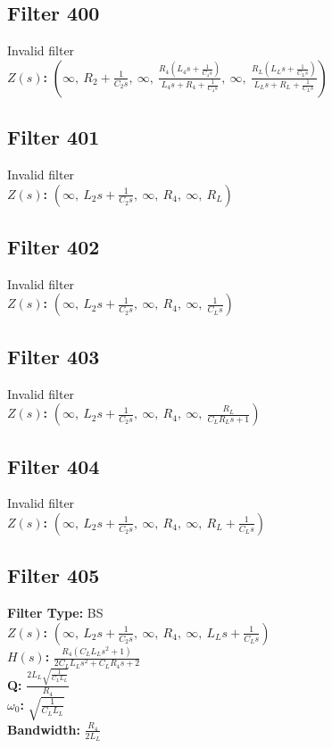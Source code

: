 \documentclass{article}
\begin{document}
\subsection*{Filter 400}
Invalid filter \\ 
\textbf{$Z(s)$:} $\left( \infty, \  R_{2} + \frac{1}{C_{2} s}, \  \infty, \  \frac{R_{4} \left(L_{4} s + \frac{1}{C_{4} s}\right)}{L_{4} s + R_{4} + \frac{1}{C_{4} s}}, \  \infty, \  \frac{R_{L} \left(L_{L} s + \frac{1}{C_{L} s}\right)}{L_{L} s + R_{L} + \frac{1}{C_{L} s}}\right)$ \\ 
\subsection*{Filter 401}
Invalid filter \\ 
\textbf{$Z(s)$:} $\left( \infty, \  L_{2} s + \frac{1}{C_{2} s}, \  \infty, \  R_{4}, \  \infty, \  R_{L}\right)$ \\ 
\subsection*{Filter 402}
Invalid filter \\ 
\textbf{$Z(s)$:} $\left( \infty, \  L_{2} s + \frac{1}{C_{2} s}, \  \infty, \  R_{4}, \  \infty, \  \frac{1}{C_{L} s}\right)$ \\ 
\subsection*{Filter 403}
Invalid filter \\ 
\textbf{$Z(s)$:} $\left( \infty, \  L_{2} s + \frac{1}{C_{2} s}, \  \infty, \  R_{4}, \  \infty, \  \frac{R_{L}}{C_{L} R_{L} s + 1}\right)$ \\ 
\subsection*{Filter 404}
Invalid filter \\ 
\textbf{$Z(s)$:} $\left( \infty, \  L_{2} s + \frac{1}{C_{2} s}, \  \infty, \  R_{4}, \  \infty, \  R_{L} + \frac{1}{C_{L} s}\right)$ \\ 
\subsection*{Filter 405}
\textbf{Filter Type:} BS \\ 
\textbf{$Z(s)$:} $\left( \infty, \  L_{2} s + \frac{1}{C_{2} s}, \  \infty, \  R_{4}, \  \infty, \  L_{L} s + \frac{1}{C_{L} s}\right)$ \\ 
\textbf{$H(s)$:} $\frac{R_{4} \left(C_{L} L_{L} s^{2} + 1\right)}{2 C_{L} L_{L} s^{2} + C_{L} R_{4} s + 2}$ \\ 
\textbf{Q:} $\frac{2 L_{L} \sqrt{\frac{1}{C_{L} L_{L}}}}{R_{4}}$ \\ 
\textbf{$\omega_0$:} $\sqrt{\frac{1}{C_{L} L_{L}}}$ \\ 
\textbf{Bandwidth:} $\frac{R_{4}}{2 L_{L}}$ \\ 
\end{document}
